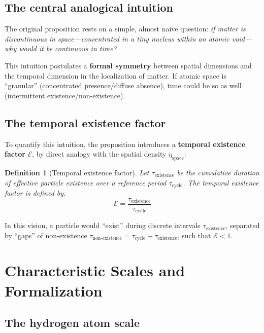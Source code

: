 \documentclass[11pt,a4paper]{article}
\newtheorem{definition}{Definition}
\begin{document}
\subsection{The central analogical intuition}

The original proposition rests on a simple, almost naive question: \textit{if matter is discontinuous in space---concentrated in a tiny nucleus within an atomic void---why would it be continuous in time?}

This intuition postulates a \textbf{formal symmetry} between spatial dimensions and the temporal dimension in the localization of matter. If atomic space is ``granular'' (concentrated presence/diffuse absence), time could be so as well (intermittent existence/non-existence).

\subsection{The temporal existence factor}

To quantify this intuition, the proposition introduces a \textbf{temporal existence factor} $\mathcal{E}$, by direct analogy with the spatial density $\eta_{\text{space}}$:

\begin{definition}[Temporal existence factor]
Let $\tau_{\text{existence}}$ be the cumulative duration of effective particle existence over a reference period $\tau_{\text{cycle}}$. The temporal existence factor is defined by:
\begin{equation}\label{eq:existence_factor}
\mathcal{E} = \frac{\tau_{\text{existence}}}{\tau_{\text{cycle}}}
\end{equation}
\end{definition}

In this vision, a particle would ``exist'' during discrete intervals $\tau_{\text{existence}}$, separated by ``gaps'' of non-existence $\tau_{\text{non-existence}} = \tau_{\text{cycle}} - \tau_{\text{existence}}$, such that $\mathcal{E} < 1$.

\section{Characteristic Scales and Formalization}

\subsection{The hydrogen atom scale}
\end{document}
